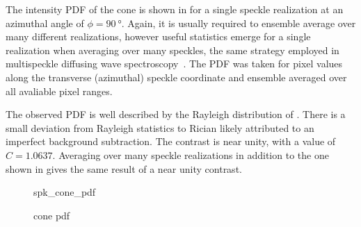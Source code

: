 The intensity PDF of the cone is shown in  for a single
speckle realization at an azimuthal angle of $\phi=\SI{90}{\degree}$.  Again,
it is usually required to ensemble average over many different realizations,
however useful statistics emerge for a single realization when averaging over
many speckles, the same strategy employed in multispeckle diffusing wave
spectroscopy~\cite{zakharov2006multispeckle}.  The PDF was taken for pixel
values along the transverse (azimuthal) speckle coordinate and ensemble
averaged over all avaliable pixel ranges.

The observed PDF is well described by the Rayleigh distribution of
.  There is a small deviation from Rayleigh statistics to
Rician likely attributed to an imperfect background subtraction.  The contrast
is near unity, with a value of $C=1.0637$.  Averaging over many speckle
realizations in addition to the one shown in  gives the
same result of a near unity contrast.  
\begin{figure}[ht]
\centering
{spk_cone_pdf}
\caption{cone pdf}
\label{fig:conepdf}
\end{figure}
